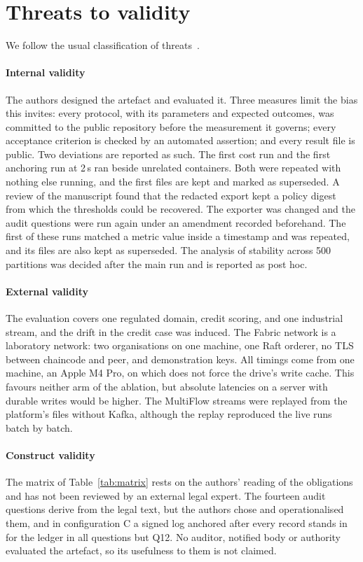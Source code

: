 \section{Threats to validity}
\label{sec:threats}

We follow the usual classification of threats~\cite{wohlin2012}.

\paragraph{Internal validity} The authors designed the artefact and evaluated it. Three measures limit the bias this invites: every protocol, with its parameters and expected outcomes, was committed to the public repository before the measurement it governs; every acceptance criterion is checked by an automated assertion; and every result file is public. Two deviations are reported as such. The first cost run and the first anchoring run at 2\,s ran beside unrelated containers. Both were repeated with nothing else running, and the first files are kept and marked as superseded. A review of the manuscript found that the redacted export kept a policy digest from which the thresholds could be recovered. The exporter was changed and the audit questions were run again under an amendment recorded beforehand. The first of these runs matched a metric value inside a timestamp and was repeated, and its files are also kept as superseded. The analysis of stability across 500 partitions was decided after the main run and is reported as post hoc.

\paragraph{External validity} The evaluation covers one regulated domain, credit scoring, and one industrial stream, and the drift in the credit case was induced. The Fabric network is a laboratory network: two organisations on one machine, one Raft orderer, no TLS between chaincode and peer, and demonstration keys. All timings come from one machine, an Apple M4 Pro, on which  does not force the drive's write cache. This favours neither arm of the ablation, but absolute latencies on a server with durable writes would be higher. The MultiFlow streams were replayed from the platform's files without Kafka, although the replay reproduced the live runs batch by batch.

\paragraph{Construct validity} The matrix of Table~\ref{tab:matrix} rests on the authors' reading of the obligations and has not been reviewed by an external legal expert. The fourteen audit questions derive from the legal text, but the authors chose and operationalised them, and in configuration C a signed log anchored after every record stands in for the ledger in all questions but Q12. No auditor, notified body or authority evaluated the artefact, so its usefulness to them is not claimed.

